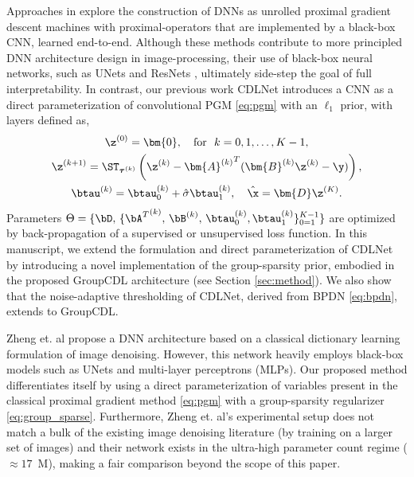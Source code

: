 \documentclass[lettersize,journal]{IEEEtran}
\begin{document}
Approaches in \cite{ongie2020deep, Gilton2019, deqWillet2021} explore the
construction of DNNs as unrolled proximal gradient descent machines with
proximal-operators that are implemented by a black-box CNN, learned end-to-end. 
Although these methods contribute to more principled DNN architecture design in image-processing, their use of black-box neural networks, such as UNets
\cite{unet} and ResNets \cite{he2016deep}, ultimately side-step the goal of full interpretability. In contrast, our previous work CDLNet \cite{janjusevicCDLNet2022} introduces a CNN as a direct parameterization of convolutional PGM \eqref{eq:pgm} with an $\ell_1$ prior, with layers defined as,
\begin{equation} \label{eq:CDLNet}
\begin{gathered}
\z^{(0)} = \bm{0}, \quad \text{for } ~ k=0,1,\dots, K-1,\\
\z^{(k+1)} = \ST_{\boldsymbol{\tau}^{(k)}}\left(\z^{(k)} - {\bm{A}^{(k)}}^T(\bm{B}^{(k)}\z^{(k)} - \y) \right), \\
\btau^{(k)} = \btau^{(k)}_0 + \hat{\sigma}\btau^{(k)}_1, \quad \hat{\x} = \bm{D}\z^{(K)}.
\end{gathered}
\end{equation}
Parameters $\Theta = \{\bD,\, \{{\bA^T}^{(k)}, \,\bB^{(k)}, \, \btau_0^{(k)}, \btau^{(k)}_1 \}_{0=1}^{K-1}\}$ are optimized by back-propagation of a supervised or unsupervised loss function. 
In this manuscript, we extend the formulation and direct parameterization of CDLNet by introducing a novel implementation of the group-sparsity prior, embodied in the proposed GroupCDL architecture (see Section \ref{sec:method}). We also show that the noise-adaptive thresholding of CDLNet, derived from BPDN \eqref{eq:bpdn}, extends to GroupCDL.

Zheng et. al \cite{Zheng_2021_CVPR} propose a DNN architecture based on a
classical dictionary learning formulation of image denoising. However, this network heavily employs black-box models such as UNets
\cite{unet} and multi-layer perceptrons (MLPs). Our proposed method
differentiates itself by using a direct parameterization of variables present
in the classical proximal gradient method \eqref{eq:pgm} with a group-sparsity
regularizer \eqref{eq:group_sparse}. Furthermore, Zheng et. al's
experimental setup does not match a bulk of the existing image denoising literature (by training
on a larger set of images) and their network exists in the ultra-high
parameter count regime ($\approx 17$~M), making a fair comparison beyond the scope
of this paper.
\end{document}
